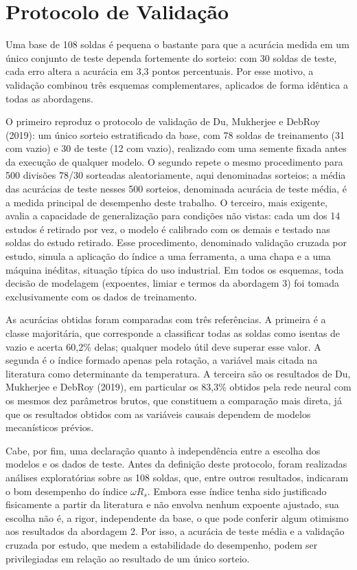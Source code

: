 \documentclass[12pt,openany]{report}
\begin{document}
\section{Protocolo de Validação}
\label{sec:validacao}

Uma base de 108 soldas é pequena o bastante para que a acurácia medida em um único conjunto de teste dependa fortemente do sorteio: com 30 soldas de teste, cada erro altera a acurácia em 3,3 pontos percentuais. Por esse motivo, a validação combinou três esquemas complementares, aplicados de forma idêntica a todas as abordagens.

O primeiro reproduz o protocolo de validação de Du, Mukherjee e DebRoy (2019): um único sorteio estratificado da base, com 78 soldas de treinamento (31 com vazio) e 30 de teste (12 com vazio), realizado com uma semente fixada antes da execução de qualquer modelo. O segundo repete o mesmo procedimento para 500 divisões 78/30 sorteadas aleatoriamente, aqui denominadas sorteios; a média das acurácias de teste nesses 500 sorteios, denominada acurácia de teste média, é a medida principal de desempenho deste trabalho. O terceiro, mais exigente, avalia a capacidade de generalização para condições não vistas: cada um dos 14 estudos é retirado por vez, o modelo é calibrado com os demais e testado nas soldas do estudo retirado. Esse procedimento, denominado validação cruzada por estudo, simula a aplicação do índice a uma ferramenta, a uma chapa e a uma máquina inéditas, situação típica do uso industrial. Em todos os esquemas, toda decisão de modelagem (expoentes, limiar e termos da abordagem 3) foi tomada exclusivamente com os dados de treinamento.

As acurácias obtidas foram comparadas com três referências. A primeira é a classe majoritária, que corresponde a classificar todas as soldas como isentas de vazio e acerta 60,2\% delas; qualquer modelo útil deve superar esse valor. A segunda é o índice formado apenas pela rotação, a variável mais citada na literatura como determinante da temperatura. A terceira são os resultados de Du, Mukherjee e DebRoy (2019), em particular os 83,3\% obtidos pela rede neural com os mesmos dez parâmetros brutos, que constituem a comparação mais direta, já que os resultados obtidos com as variáveis causais dependem de modelos mecanísticos prévios.

Cabe, por fim, uma declaração quanto à independência entre a escolha dos modelos e os dados de teste. Antes da definição deste protocolo, foram realizadas análises exploratórias sobre as 108 soldas, que, entre outros resultados, indicaram o bom desempenho do índice $\omega R_s$. Embora esse índice tenha sido justificado fisicamente a partir da literatura e não envolva nenhum expoente ajustado, sua escolha não é, a rigor, independente da base, o que pode conferir algum otimismo aos resultados da abordagem 2. Por isso, a acurácia de teste média e a validação cruzada por estudo, que medem a estabilidade do desempenho, podem ser privilegiadas em relação ao resultado de um único sorteio.
\end{document}
